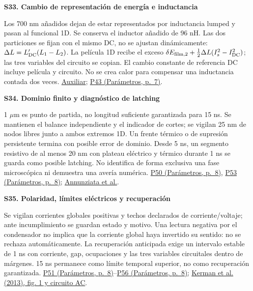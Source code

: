 \documentclass[11pt,a4paper]{article}
\newcommand{\pref}[2]{\href{Parametros.pdf\#nameddest=#1}{#1 (Parámetros, p.~#2)}}
\newcommand{\assumption}[2]{\par\vspace{6pt}\hypertarget{#1}{\textbf{\color{ink}#1. #2}}\par}
\newcommand{\smallnote}[1]{{\small #1\par}}
\begin{document}
\clearpage
\assumption{S33}{Cambio de representación de energía e inductancia}
\smallnote{Los 700 nm añadidos dejan de estar representados por inductancia
lumped y pasan al funcional 1D. Se conserva el inductor añadido de 96 nH.
Las dos particiones se fijan con el mismo DC, no se ajustan dinámicamente:
\(\Delta L=L'_{\rm DC}(L_1-L_2)\).
La película 1D recibe el exceso
\(\delta E_{\rm film,2}+\frac12\Delta L(I_s^2-I_{\rm DC}^2)\);
las tres variables del circuito se copian.
El cambio constante de referencia DC incluye película y circuito.
No se crea calor para compensar una inductancia contada dos veces.
\href{Auxiliar.pdf\#nameddest=dimensional-1d}{Auxiliar};
\pref{P43}{7}.}
\assumption{S34}{Dominio finito y diagnóstico de latching}
\smallnote{1 \(\mu\)m es punto de partida, no longitud suficiente garantizada
para 15 ns. Se mantienen el balance independiente y el indicador de cortes;
se vigilan 25 nm de nodos libres junto a ambos extremos 1D.
Un frente térmico o de supresión persistente termina con posible error de
dominio. Desde 5 ns, un segmento resistivo de al menos 20 nm con plateau
eléctrico y térmico durante 1 ns se guarda como posible latching.
No identifica de forma exclusiva una fase microscópica ni demuestra una avería
numérica. \pref{P50}{8}, \pref{P53}{8};
\href{https://arxiv.org/abs/1008.0895}{Annunziata et al.}.}
\assumption{S35}{Polaridad, límites eléctricos y recuperación}
\smallnote{Se vigilan corrientes globales positivas y techos declarados de
corriente/voltaje; ante incumplimiento se guardan estado y motivo.
Una lectura negativa por el condensador no implica que la corriente global
haya invertido su sentido: no se rechaza automáticamente.
La recuperación anticipada exige un intervalo estable de 1 ns con corriente,
gap, ocupaciones y las tres variables circuitales dentro de márgenes.
15 ns permanece como límite temporal superior, no como recuperación garantizada.
\pref{P51}{8}--\pref{P56}{8};
\href{https://arxiv.org/pdf/1302.2852}{Kerman et al. (2013), fig. 1 y circuito AC}.}
\end{document}
